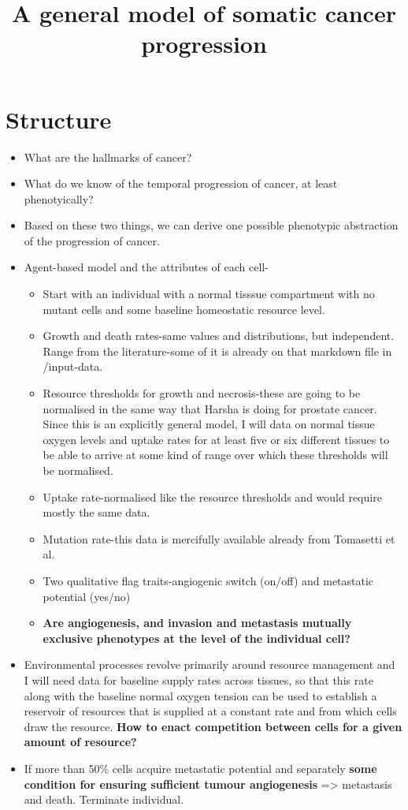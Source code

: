 \documentclass[12pt,onecolumn,twoside]{article}
\title{A general model of somatic cancer progression}
\date{\empty}
\begin{document}
    \maketitle
    \section{Structure}
    \begin{itemize}
        \item What are the hallmarks of cancer?
        \item What do we know of the temporal progression of cancer, at least phenotyically?
        \item Based on these two things, we can derive one possible phenotypic abstraction of the progression of cancer.
        \item Agent-based model and the attributes of each cell-
            \begin{itemize}
                \item Start with an individual with a normal tisssue compartment with no mutant cells and some baseline homeostatic resource level.
                \item Growth and death rates-same values and distributions, but independent. Range from the literature-some of it is already on that markdown file in /input-data.
                \item Resource thresholds for growth and necrosis-these are going to be normalised in the same way that Harsha is doing for prostate cancer. Since this is an explicitly general model, I will data on normal tissue oxygen levels and uptake rates for at least five or six different tissues to be able to arrive at some kind of range over which these thresholds will be normalised.
                \item Uptake rate-normalised like the resource thresholds and would require mostly the same data.
                \item Mutation rate-this data is mercifully available already from Tomasetti et al.
                \item Two qualitative flag traits-angiogenic switch (on/off) and metastatic potential (yes/no)
                \item \textbf{Are angiogenesis, and invasion and metastasis mutually exclusive phenotypes at the level of the individual cell?}
            \end{itemize}
        \item Environmental processes revolve primarily around resource management and I will need data for baseline supply rates across tissues, so that this rate along with the baseline normal oxygen tension can be used to establish a reservoir of resources that is supplied at a constant rate and from which cells draw the resource. \textbf{How to enact competition between cells for a given amount of resource?}
        \item If more than 50\% cells acquire metastatic potential and separately \textbf{some condition for ensuring sufficient tumour angiogenesis} => metastasis and death. Terminate individual.
    \end{itemize}
\end{document}
